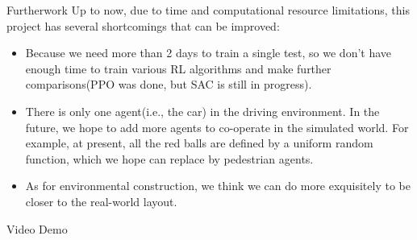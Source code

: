 \documentclass[final]{beamer}
\newlength{\onecolwid}
\begin{document}
\begin{frame}[t]
\begin{columns}[t]
\begin{column}{\onecolwid}
\begin{block}{Furtherwork}
Up to now, due to time and computational resource limitations, this project has several shortcomings that can be improved:
\begin{itemize}
\item Because we need more than 2 days to train a single test, so we don't have enough time to train various RL algorithms and make further comparisons(PPO was done, but SAC is still in progress).
\item There is only one agent(i.e., the car) in the driving environment. In the future, we hope to add more agents to co-operate in the simulated world. For example, at present, all the red balls are defined by a uniform random function, which we hope can replace by pedestrian agents.
\item As for environmental construction, we think we can do more exquisitely to be closer to the real-world layout.
\end{itemize}

\end{block}







\begin{block}{Video Demo}

\small{} \\
 

\end{block}
\end{column}
\end{columns}
\end{frame}
\end{document}
